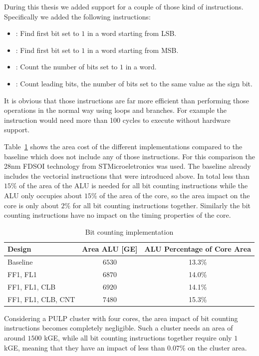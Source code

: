 During this thesis we added support for a couple of those kind of instructions.
Specifically we added the following instructions:

\begin{itemize}
  \item {}: Find first bit set to $1$ in a word starting from
    \gls{LSB}.
  \item {}: Find first bit set to $1$ in a word starting from
    \gls{MSB}.
  \item {}: Count the number of bits set to $1$ in a word.
  \item {}: Count leading bits, the number of bits set to the same
    value as the sign bit.
\end{itemize}

It is obvious that those instructions are far more efficient than performing
those operations in the normal way using loops and branches. For example the
 instruction would need more than 100 cycles to execute without
hardware support.

Table~\ref{tab:bit_count_syn} shows the area cost of the different
implementations compared to the baseline which does not include any of those
instructions. For this comparison the 28nm FDSOI technology from
STMicroeletronics was used. The baseline already includes the vectorial
instructions that were introduced above.
In total less than $15\%$ of the area of the \gls{ALU} is needed for all bit
counting instructions while the \gls{ALU} only occupies about $15\%$ of the area
of the core, so the area impact on the core is only about $2\%$ for all bit
counting instructions together. Similarly the bit counting instructions have no
impact on the timing properties of the core.


\begin{table}[H]
 \caption{Bit counting implementation}
 \label{tab:bit_count_syn}
 \centering\begin{tabular}{@{}lcc@{}} \toprule
   \textbf{Design}      & \textbf{Area ALU [GE]} & \textbf{ALU Percentage of Core Area} \\ \midrule
  Baseline             &           $6530$        & 13.3\% \\
  FF1, FL1             &           $6870$        & 14.0\%\\
  FF1, FL1, CLB        &           $6920$        & 14.1\%\\
  FF1, FL1, CLB, CNT   &           $7480$        & 15.3\%\\
  \bottomrule
 \end{tabular}
\end{table}

Considering a \gls{PULP} cluster with four cores, the area impact of bit counting
instructions becomes completely negligible. Such a cluster needs an area of
around $1500$ kGE, while all bit counting instructions together require only $1$
kGE, meaning that they have an impact of less than $0.07\%$ on the cluster area.
